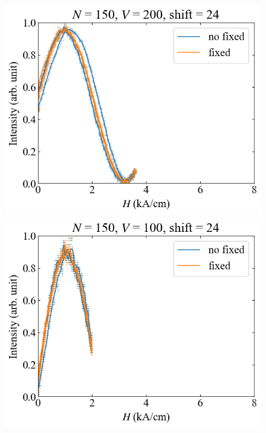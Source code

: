 \documentclass[9pt,dvipdfmx,a4paper]{jsarticle}
\begin{document}
\begin{figure}[H]
    \hfill
    \begin{minipage}[t]{0.24\columnwidth}
        \centering
        \includegraphics[width = \columnwidth]{xy/24.png}
    \end{minipage}
    \hfill
    \begin{minipage}[t]{0.24\columnwidth}
        \centering
        \includegraphics[width = \columnwidth]{xy/25.png}
    \end{minipage}
\end{figure}
\fi
\end{document}
